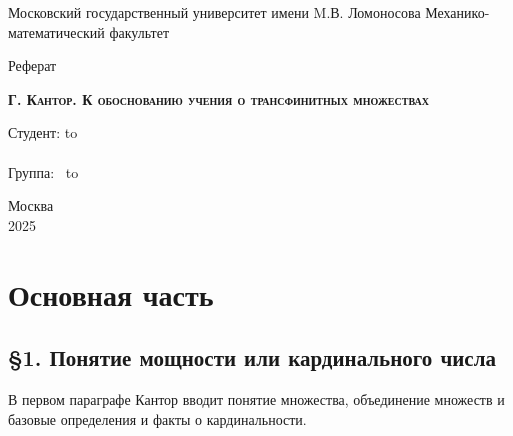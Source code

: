 \documentclass[a4paper,12pt]{extarticle}
\author{Борисенков Никита}
\theoremstyle{definition}
\begin{document}
\begin{titlepage}
    \newpage
    \begin{center}
        Московский государственный университет имени M.В. Ломоносова
        Механико-математический факультет\\
    \end{center}

    \vspace{8em}

    \begin{center}
        \Large Реферат\\
    \end{center}

    \vspace{2em}

    \begin{center}
        \textsc{\textbf{Г. Кантор. К обоснованию учения о трансфинитных множествах}}
    \end{center}

    \vspace{20em}



    \newbox{\lbox}
    \newlength{\maxl}
    \setlength{\maxl}{\wd\lbox}
    \hfill\parbox{13cm}{
        \hspace*{5cm}\hspace*{-5cm}Студент: \qquad\qquad\hbox to \\
        \\
        \hspace*{5cm}\hspace*{-5cm}Группа:\qquad\qquad $\;\:$ \hbox to\\
    }


    \vspace{\fill}

    \begin{center}
        Москва \\2025
    \end{center}

\end{titlepage}
\newpage

\section{Основная часть}
\subsection{\S 1. Понятие мощности или кардинального числа}
В первом параграфе Кантор вводит понятие множества, объединение множеств и базовые определения и факты о кардинальности.
\end{document}
